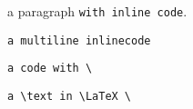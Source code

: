 a paragraph \texttt{with inline code}.

\texttt{a
multiline
inlinecode}

\texttt{a code with \textbackslash}

\texttt{a \textbackslash text in \textbackslash LaTeX \textbackslash}
